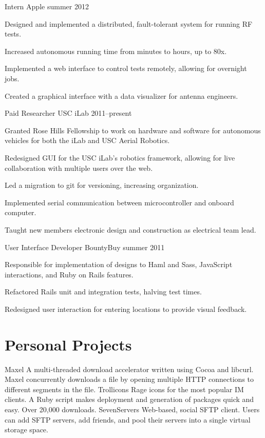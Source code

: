 \documentclass[print]{friggeri-cv}
\newenvironment{itemize*}%
  {\begin{itemize}%
    \setlength{\itemsep}{0pt}%
    \setlength{\parskip}{0pt}}%
  {\end{itemize}}
\begin{document}
\workexperience
  {Intern}
  {Apple}
  {summer 2012}
  {
  Designed and implemented a distributed, fault-tolerant system for running RF tests.
  \begin{itemize*}
    \item Increased autonomous running time from minutes to hours, up to 80x.
    \item Implemented a web interface to control tests remotely, allowing for overnight jobs.
    \item Created a graphical interface with a data visualizer for antenna engineers.
  \end{itemize*}
  }

\workexperience
  {Paid Researcher}
  {USC iLab}
  {2011--present}
  {
  Granted Rose Hills Fellowship to work on hardware and software for autonomous vehicles for both the iLab and USC Aerial Robotics.
  \begin{itemize*}
    \item Redesigned GUI for the USC iLab's robotics framework, allowing for live collaboration with multiple users over the web.
    \item Led a migration to git for versioning, increasing organization.
    \item Implemented serial communication between microcontroller and onboard computer.
    \item Taught new members electronic design and construction as electrical team lead.
  \end{itemize*}
  }

\workexperience
  {User Interface Developer}
  {BountyBuy}
  {summer 2011}
  {
  Responsible for implementation of designs to Haml and Sass, JavaScript interactions, and Ruby on Rails features.
  \begin{itemize*}
    \item Refactored Rails unit and integration tests, halving test times.
    \item Redesigned user interaction for entering locations to provide visual feedback.
  \end{itemize*}
  }  

\section{Personal Projects}

\begin{entrylist}
  \project
    {Maxel}
    {A multi-threaded download accelerator written using Cocoa and libcurl. Maxel concurrently downloads a file by opening multiple HTTP connections to different segments in the file.}
  \project
    {Trollicons}
    {Rage icons for the most popular IM clients. A Ruby script makes deployment and generation of packages quick and easy. Over 20,000 downloads.}
  \project
    {SevenServers}
    {Web-based, social SFTP client. Users can add SFTP servers, add friends, and pool their servers into a single virtual storage space.}
\end{entrylist}

\nopagebreak
\end{document}
